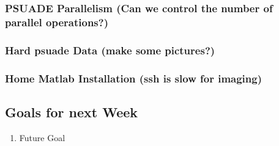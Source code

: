 \documentclass[11pt]{article} %
\begin{document}
\subsubsection{PSUADE Parallelism (Can we control the number of parallel operations?)}

\subsubsection{Hard psuade Data (make some pictures?)}

\subsubsection{Home Matlab Installation (ssh is slow for imaging)}



\subsection{Goals for next Week}
\begin{enumerate}
\item Future Goal
\end{enumerate}
\end{document}
